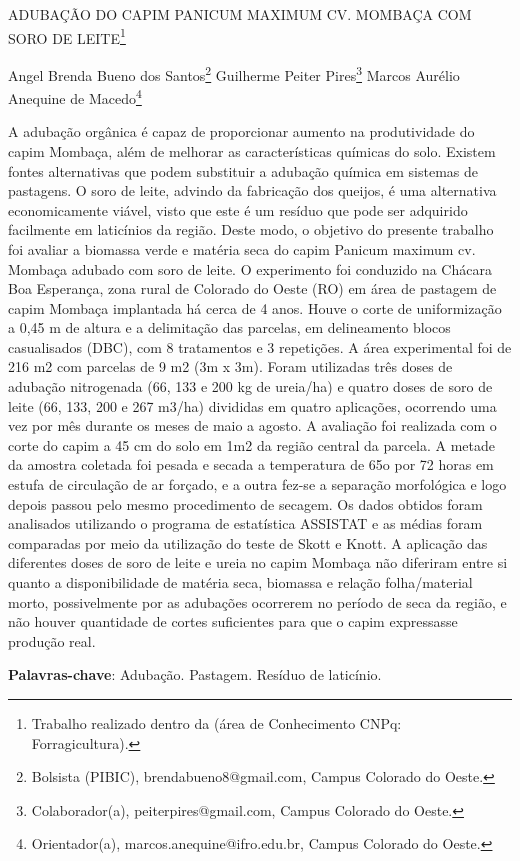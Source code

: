 \documentclass[article,12pt,onesidea,4paper,english,brazil]{abntex2}
\begin{document}
	
	
	\frenchspacing 
	
	\begin{center}
		\LARGE ADUBAÇÃO DO CAPIM PANICUM MAXIMUM CV. MOMBAÇA COM SORO DE LEITE\footnote{Trabalho realizado dentro da (área de Conhecimento CNPq: Forragicultura).}
		
		\normalsize
		Angel Brenda Bueno dos Santos\footnote{Bolsista (PIBIC), brendabueno8@gmail.com, Campus Colorado do Oeste.} 
		Guilherme Peiter Pires\footnote{Colaborador(a), peiterpires@gmail.com, Campus Colorado do Oeste.} 
		Marcos Aurélio Anequine de Macedo\footnote{Orientador(a), marcos.anequine@ifro.edu.br, Campus Colorado do Oeste.}
	\end{center}
	
	\noindent A adubação orgânica é capaz de proporcionar aumento na produtividade do capim
	Mombaça, além de melhorar as características químicas do solo. Existem fontes
	alternativas que podem substituir a adubação química em sistemas de pastagens. O
	soro de leite, advindo da fabricação dos queijos, é uma alternativa economicamente
	viável, visto que este é um resíduo que pode ser adquirido facilmente em laticínios
	da região. Deste modo, o objetivo do presente trabalho foi avaliar a biomassa verde
	e matéria seca do capim Panicum maximum cv. Mombaça adubado com soro de
	leite. O experimento foi conduzido na Chácara Boa Esperança, zona rural de
	Colorado do Oeste (RO) em área de pastagem de capim Mombaça implantada há
	cerca de 4 anos. Houve o corte de uniformização a 0,45 m de altura e a delimitação
	das parcelas, em delineamento blocos casualisados (DBC), com 8 tratamentos e 3
	repetições. A área experimental foi de 216 m2 com parcelas de 9 m2 (3m x 3m).
	Foram utilizadas três doses de adubação nitrogenada (66, 133 e 200 kg de ureia/ha)
	e quatro doses de soro de leite (66, 133, 200 e 267 m3/ha) divididas em quatro
	aplicações, ocorrendo uma vez por mês durante os meses de maio a agosto. A
	avaliação foi realizada com o corte do capim a 45 cm do solo em 1m2 da região
	central da parcela. A metade da amostra coletada foi pesada e secada a
	temperatura de 65o por 72 horas em estufa de circulação de ar forçado, e a outra
	fez-se a separação morfológica e logo depois passou pelo mesmo procedimento de
	secagem. Os dados obtidos foram analisados utilizando o programa de estatística
	ASSISTAT e as médias foram comparadas por meio da utilização do teste de Skott e
	Knott. A aplicação das diferentes doses de soro de leite e ureia no capim Mombaça
	não diferiram entre si quanto a disponibilidade de matéria seca, biomassa e relação
	folha/material morto, possivelmente por as adubações ocorrerem no período de seca
	da região, e não houver quantidade de cortes suficientes para que o capim
	expressasse produção real.
	
	\vspace{\onelineskip}
	
	\noindent
	\textbf{Palavras-chave}: Adubação. Pastagem. Resíduo de laticínio.
	
\end{document}
